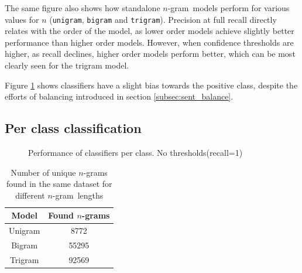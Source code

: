 \documentclass[a4paper,11pt]{kth-mag}
\newcommand{\ngram}{$n$-gram}
\begin{document}
The same figure also shows how standalone \ngram~models perform for various values for $n$
(\texttt{unigram}, \texttt{bigram} and \texttt{trigram}).
Precision at full recall directly relates with the order of the model, as lower order
models achieve slightly better performance than higher order models.
However, when confidence thresholds are higher, as recall declines,
higher order models perform better, which can be most clearly seen for the trigram model.

Figure \ref{fig:sent_bias} shows classifiers have a slight bias towards the positive class, despite the efforts of balancing introduced in section \ref{subsec:sent_balance}.

\newpage

\subsection{Per class classification}
\begin{figure}[h]
  \centering
  \caption{Performance of classifiers per class. No thresholds(recall=1)}
  \label{fig:sent_bias}
\end{figure}


\begin{table}[t]
  \centering
  \begin{tabular}{| c | c |}
    \hline
    \textbf{Model} & \textbf{Found \ngram s}\\ \hline
    Unigram&8772\\
    Bigram&55295\\
    Trigram&92569\\
    \hline
  \end{tabular}
  \caption{Number of unique \ngram s found in the same dataset for different \ngram~lengths}
  \label{tab:found_ngrams}
\end{table}
\end{document}
